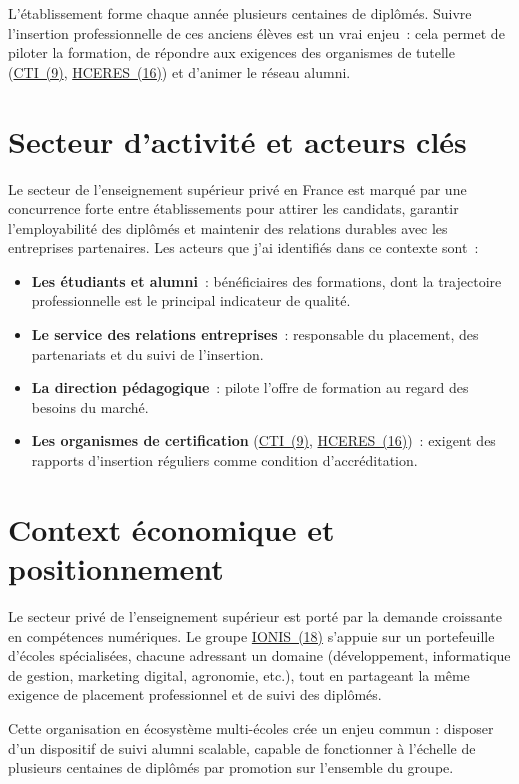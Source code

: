 \documentclass[12pt,a4paper]{report}
\begin{document}
L'établissement forme chaque année plusieurs centaines de diplômés. Suivre l'insertion professionnelle de ces anciens élèves est un vrai enjeu~: cela permet de piloter la formation, de répondre aux exigences des organismes de tutelle (\hyperlink{abbr-CTI}{CTI~(9)}, \hyperlink{abbr-HCERES}{HCERES~(16)}) et d'animer le réseau alumni.

\section{Secteur d'activité et acteurs clés}

Le secteur de l'enseignement supérieur privé en France est marqué par une concurrence forte entre établissements pour attirer les candidats, garantir l'employabilité des diplômés et maintenir des relations durables avec les entreprises partenaires. Les acteurs que j'ai identifiés dans ce contexte sont~:

\begin{itemize}
  \item \textbf{Les étudiants et alumni}~: bénéficiaires des formations, dont la trajectoire professionnelle est le principal indicateur de qualité.
  \item \textbf{Le service des relations entreprises}~: responsable du placement, des partenariats et du suivi de l'insertion.
  \item \textbf{La direction pédagogique}~: pilote l'offre de formation au regard des besoins du marché.
  \item \textbf{Les organismes de certification} (\hyperlink{abbr-CTI}{CTI~(9)}, \hyperlink{abbr-HCERES}{HCERES~(16)})~: exigent des rapports d'insertion réguliers comme condition d'accréditation.
\end{itemize}

\section{Context économique et positionnement}

Le secteur privé de l'enseignement supérieur est porté par la demande croissante en compétences numériques. Le groupe \hyperlink{abbr-IONIS}{IONIS~(18)} s'appuie sur un portefeuille d'écoles spécialisées, chacune adressant un domaine (développement, informatique de gestion, marketing digital, agronomie, etc.), tout en partageant la même exigence de placement professionnel et de suivi des diplômés.

Cette organisation en écosystème multi-écoles crée un enjeu commun : disposer d'un dispositif de suivi alumni scalable, capable de fonctionner à l'échelle de plusieurs centaines de diplômés par promotion sur l'ensemble du groupe.
\end{document}

